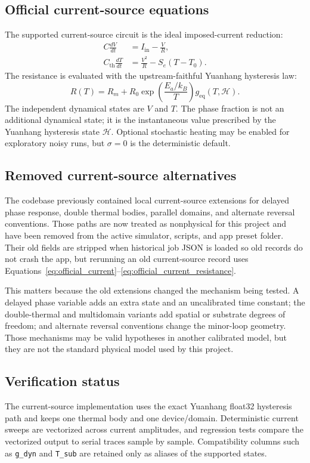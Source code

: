 \documentclass[11pt]{article}
\begin{document}
\subsection{Official current-source equations}
The supported current-source circuit is the ideal imposed-current reduction:
\begin{align}
C\frac{dV}{dt} &= I_{\mathrm{in}}-\frac{V}{R}, \label{eq:official_current}\\
C_{\mathrm{th}}\frac{dT}{dt} &= \frac{V^2}{R}-S_e(T-T_0). \label{eq:official_thermal}
\end{align}
The resistance is evaluated with the upstream-faithful Yuanhang hysteresis law:
\begin{equation}
R(T)=R_m+R_0\exp\left(\frac{E_a/k_B}{T}\right)
g_{\mathrm{eq}}\!\left(T,\mathcal{H}\right).
\label{eq:official_current_resistance}
\end{equation}
The independent dynamical states are \(V\) and \(T\). The phase fraction is not an additional dynamical state; it is the instantaneous value prescribed by the Yuanhang hysteresis state \(\mathcal{H}\). Optional stochastic heating may be enabled for exploratory noisy runs, but \(\sigma=0\) is the deterministic default.

\subsection{Removed current-source alternatives}
The codebase previously contained local current-source extensions for delayed phase response, double thermal bodies, parallel domains, and alternate reversal conventions. Those paths are now treated as nonphysical for this project and have been removed from the active simulator, scripts, and app preset folder. Their old fields are stripped when historical job JSON is loaded so old records do not crash the app, but rerunning an old current-source record uses Equations~\eqref{eq:official_current}--\eqref{eq:official_current_resistance}.

This matters because the old extensions changed the mechanism being tested. A delayed phase variable adds an extra state and an uncalibrated time constant; the double-thermal and multidomain variants add spatial or substrate degrees of freedom; and alternate reversal conventions change the minor-loop geometry. Those mechanisms may be valid hypotheses in another calibrated model, but they are not the standard physical model used by this project.

\subsection{Verification status}
The current-source implementation uses the exact Yuanhang float32 hysteresis path and keeps one thermal body and one device/domain. Deterministic current sweeps are vectorized across current amplitudes, and regression tests compare the vectorized output to serial traces sample by sample. Compatibility columns such as \texttt{g\_dyn} and \texttt{T\_sub} are retained only as aliases of the supported states.
\end{document}
